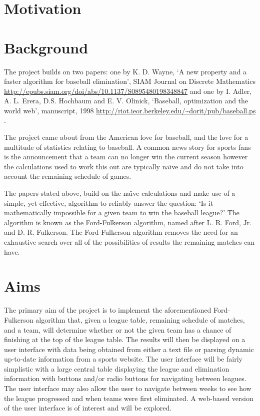 \section{Motivation}

\section{Background}

The project builds on two papers: one by K. D. Wayne, `A new property and a 
faster algorithm for baseball elimination', SIAM Journal on Discrete 
Mathematics \url{http://epubs.siam.org/doi/abs/10.1137/S0895480198348847}
\cite{Wayne} and one by I. Adler, A. L. Erera, D.S. Hochbaum and E. V. Olinick,
`Baseball, optimization and the world web', manuscript, 1998
\url{http://riot.ieor.berkeley.edu/~dorit/pub/baseball.ps} \cite{Adler}.

The project came about from the American love for baseball, and the love for
a multitude of statistics relating to baseball. A common news story for sports
fans is the announcement that a team can no longer win the current season
however the calculations used to work this out are typically na\"{\i}ve and
do not take into account the remaining schedule of games.

The papers stated above, build on the na\"{\i}ve calculations and make use of a
simple, yet effective, algorithm to reliably answer the question:
`Is it mathematically impossible for a given team to win the baseball league?'
The algorithm is known as the Ford-Fulkerson algorithm, named after L. R. Ford,
Jr. and D. R. Fulkerson. The Ford-Fulkerson algorithm removes the need for an
exhaustive search over all of the possibilities of results the remaining
matches can have.

\section{Aims}

The primary aim of the project is to implement the aforementioned
Ford-Fulkerson algorithm that, given a league table, remaining schedule of
matches, and a team, will determine whether or not the given team has a
chance of finishing at the top of the league table. The results will then
be displayed on a user interface with data being obtained from either a text
file or parsing dynamic up-to-date information from a sports website. The user
interface will be fairly simplistic with a large central table displaying the 
league and elimination information with buttons and/or radio buttons for 
navigating between leagues. The user interface may also allow the user to 
navigate between weeks to see how the league progressed and when teams were 
first eliminated. A web-based version of the user interface is of interest and 
will be explored.

